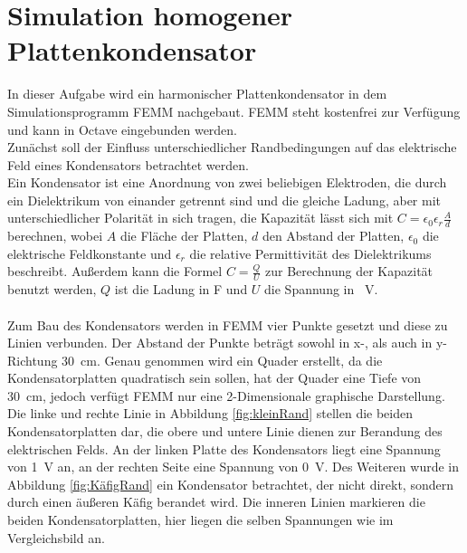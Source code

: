 \section{Simulation homogener Plattenkondensator}\label{sec:ag3_3}
In dieser Aufgabe wird ein harmonischer Plattenkondensator in dem Simulationsprogramm \glqq FEMM \grqq{} nachgebaut. FEMM steht kostenfrei zur Verfügung und kann in Octave eingebunden werden.\\
Zunächst soll der Einfluss unterschiedlicher Randbedingungen auf das elektrische Feld eines Kondensators betrachtet werden. \\
Ein Kondensator ist eine Anordnung von zwei beliebigen Elektroden, die durch ein Dielektrikum von einander getrennt sind und die gleiche Ladung, aber mit unterschiedlicher Polarität in sich tragen, die Kapazität lässt sich mit $ C = \epsilon_{0}\epsilon_{r}\frac{A}{d}$ berechnen, wobei $A$ die Fläche der Platten, $d$ den Abstand der Platten, $\epsilon_{0}$ die elektrische Feldkonstante und $\epsilon_{r}$ die relative Permittivität des Dielektrikums beschreibt. Außerdem kann die Formel $C = \frac{Q}{U}$ zur Berechnung der Kapazität benutzt werden, $Q$ ist die Ladung in \si{\farad} und $U$ die Spannung in \SI{}{\volt}. \\ \\
Zum Bau des Kondensators werden in FEMM vier Punkte gesetzt und diese zu Linien verbunden. Der Abstand der Punkte beträgt sowohl in x-, als auch in y-Richtung \SI{30}{\centi\meter}. Genau genommen wird ein Quader erstellt, da die Kondensatorplatten quadratisch sein sollen, hat der Quader eine Tiefe von \SI{30}{\centi\meter}, jedoch verfügt FEMM nur eine 2-Dimensionale graphische Darstellung.\\
 Die linke und rechte Linie in Abbildung \ref{fig:kleinRand} stellen die beiden Kondensatorplatten dar, die obere und untere Linie dienen zur Berandung des elektrischen Felds. An der linken Platte des Kondensators liegt eine Spannung von \SI{1}{\volt} an, an der rechten Seite eine Spannung von \SI{0}{\volt}. Des Weiteren wurde in Abbildung \ref{fig:KäfigRand} ein Kondensator betrachtet, der nicht direkt, sondern durch einen äußeren Käfig berandet wird. Die inneren Linien markieren die beiden Kondensatorplatten, hier liegen die selben Spannungen wie im Vergleichsbild an.
